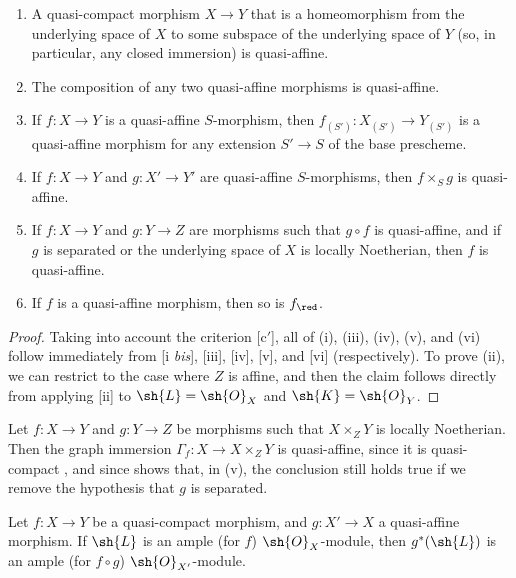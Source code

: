 \begin{proposition}[5.1.10]
\label{II.5.1.10}
\medskip\noindent
\begin{enumerate}
  \item[{\rm(i)}] A quasi-compact morphism $X\to Y$ that is a homeomorphism from the underlying space of $X$ to some subspace of the underlying space of $Y$ (so, in particular, any closed immersion) is quasi-affine.
  \item[{\rm(ii)}] The composition of any two quasi-affine morphisms is quasi-affine.
  \item[{\rm(iii)}] If $f:X\to Y$ is a quasi-affine $S$-morphism, then $f_{(S')}:X_{(S')}\to Y_{(S')}$ is a quasi-affine morphism for any extension $S'\to S$ of the base prescheme.
  \item[{\rm(iv)}] If $f:X\to Y$ and $g:X'\to Y'$ are quasi-affine $S$-morphisms, then $f\times_S g$ is quasi-affine.
  \item[{\rm(v)}] If $f:X\to Y$ and $g:Y\to Z$ are morphisms such that $g\circ f$ is quasi-affine, and if $g$ is separated or the underlying space of $X$ is locally Noetherian, then $f$ is quasi-affine.
  \item[{\rm(vi)}] If $f$ is a quasi-affine morphism, then so is $f_\red$.
\end{enumerate}
\end{proposition}

\begin{proof}
Taking into account the criterion [c$'$], all of (i), (iii), (iv), (v), and (vi) follow immediately from [i \emph{bis}], [iii], [iv], [v], and [vi] (respectively).
To prove (ii), we can restrict to the case where $Z$ is affine, and then the claim follows directly from applying [ii] to $\sh{L}=\sh{O}_X$ and $\sh{K}=\sh{O}_Y$.
\end{proof}

\begin{remark}[5.1.11]
\label{II.5.1.11}
Let $f:X\to Y$ and $g:Y\to Z$ be morphisms such that $X\times_Z Y$ is locally Noetherian.
Then the graph immersion $\Gamma_f:X\to X\times_Z Y$ is quasi-affine, since it is quasi-compact , and since  shows that, in (v), the conclusion still holds true if we remove the hypothesis that $g$ is separated.
\end{remark}

\begin{proposition}[5.1.12]
\label{II.5.1.12}
Let $f:X\to Y$ be a quasi-compact morphism, and $g:X'\to X$ a quasi-affine morphism.
If $\sh{L}$ is an ample (for $f$) $\sh{O}_X$-module, then $g^*(\sh{L})$ is an ample (for $f\circ g$) $\sh{O}_{X'}$-module.
\end{proposition}


